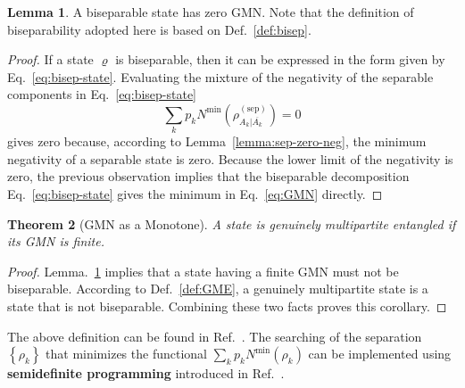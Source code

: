 \documentclass[12font]{article}
\newtheorem{theorem}{Theorem}[section]
\theoremstyle{definition}
\newtheorem{lemma}[theorem]{Lemma}
\newcommand{\lr}[1]{\left(  #1  \right)}
\newcommand{\lrg}[1]{\left\{  #1  \right\}}
\newcommand{\mrm}[1]{\mathrm{#1}}
\begin{document}
\begin{lemma}\label{lemma:bisep-zero-GMN}
    A biseparable state has zero GMN. Note that the definition of biseparability adopted here is based on Def.~\ref{def:bisep}.
\end{lemma}
\begin{proof}
    If a state $\varrho$ is biseparable, then it can be expressed in the form given by Eq.~\ref{eq:bisep-state}. Evaluating the mixture of the negativity of the separable components in Eq.~\eqref{eq:bisep-state} 
    \[
    \sum_{k}p_k N^{\mrm{min}} \lr{\rho^{(\mrm{sep})}_{A_k|\overline{A_k}}}
    =
    0
    \]
    gives zero because, according to Lemma~\ref{lemma:sep-zero-neg}, the minimum negativity of a separable state is zero. Because the lower limit of the negativity is zero, the previous observation implies that the biseparable decomposition Eq.~\eqref{eq:bisep-state} gives the minimum in Eq.~\eqref{eq:GMN} directly. 
\end{proof}

\begin{theorem}[GMN as a Monotone]
    A state is genuinely multipartite entangled if its GMN is finite.
\end{theorem}
\begin{proof}
    Lemma.~\ref{lemma:bisep-zero-GMN} implies that a state having a finite GMN must not be biseparable. According to Def.~\ref{def:GME}, a genuinely multipartite state is a state that is not biseparable. Combining these two facts proves this corollary.
\end{proof}

The above definition can be found in Ref.~\cite{Lyu-Chandorkar-Kapoor-Takei-Sorensen-Witczak-Krempa_2026}. The searching of the separation $\lrg{\rho_k}$ that minimizes the functional $\sum_{k}p_k N^{\mrm{min}}(\rho_k)$ can be implemented using \textbf{semidefinite programming} introduced in Ref.~\cite{Jungnitsch-Moroder-Guhne_2011, Hofmann-Moroder-Guhne_2014}.
\end{document}
